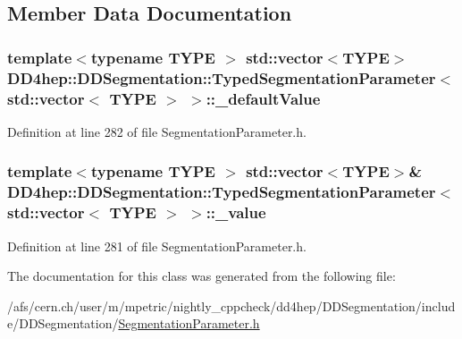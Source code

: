\subsection{Member Data Documentation}
\hypertarget{class_d_d4hep_1_1_d_d_segmentation_1_1_typed_segmentation_parameter_3_01std_1_1vector_3_01_t_y_p_e_01_4_01_4_a8756d0b27bf93d8e6d00a98d3038a1bd}{
\subsubsection[{\_\-defaultValue}]{\setlength{\rightskip}{0pt plus 5cm}template$<$typename TYPE $>$ std::vector$<$TYPE$>$ {\bf DD4hep::DDSegmentation::TypedSegmentationParameter}$<$ std::vector$<$ TYPE $>$ $>$::{\bf \_\-defaultValue}}}
\label{class_d_d4hep_1_1_d_d_segmentation_1_1_typed_segmentation_parameter_3_01std_1_1vector_3_01_t_y_p_e_01_4_01_4_a8756d0b27bf93d8e6d00a98d3038a1bd}


Definition at line 282 of file SegmentationParameter.h.\hypertarget{class_d_d4hep_1_1_d_d_segmentation_1_1_typed_segmentation_parameter_3_01std_1_1vector_3_01_t_y_p_e_01_4_01_4_ac1ad16f1b2e4175cd7c428417fa8e038}{
\subsubsection[{\_\-value}]{\setlength{\rightskip}{0pt plus 5cm}template$<$typename TYPE $>$ std::vector$<$TYPE$>$\& {\bf DD4hep::DDSegmentation::TypedSegmentationParameter}$<$ std::vector$<$ TYPE $>$ $>$::{\bf \_\-value}}}
\label{class_d_d4hep_1_1_d_d_segmentation_1_1_typed_segmentation_parameter_3_01std_1_1vector_3_01_t_y_p_e_01_4_01_4_ac1ad16f1b2e4175cd7c428417fa8e038}


Definition at line 281 of file SegmentationParameter.h.

The documentation for this class was generated from the following file:\begin{DoxyCompactItemize}
\item 
/afs/cern.ch/user/m/mpetric/nightly\_\-cppcheck/dd4hep/DDSegmentation/include/DDSegmentation/\hyperlink{_segmentation_parameter_8h}{SegmentationParameter.h}\end{DoxyCompactItemize}
